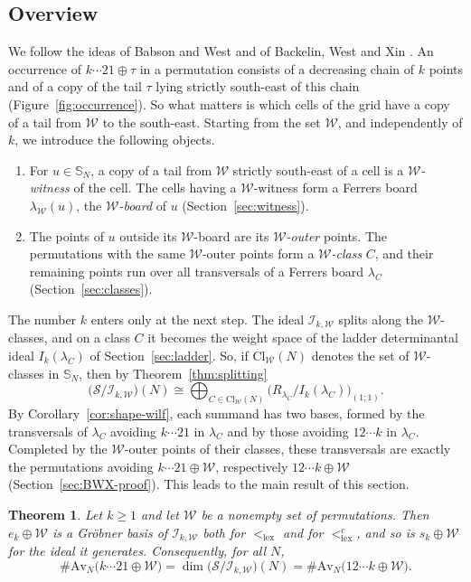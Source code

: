\documentclass[11pt]{amsart}
\newtheorem{theorem}{Theorem}[section]
\theoremstyle{definition}
\theoremstyle{remark}
\newcommand{\bS}{\mathbb{S}}
\newcommand{\Cl}{\mathrm{Cl}}
\newcommand{\cI}{\mathscr{I}}
\newcommand{\cS}{\mathscr{S}}
\newcommand{\cW}{\mathcal{W}}
\newcommand{\Av}{\mathrm{Av}}
\newcommand{\lex}{\mathrm{lex}}
\begin{document}
\subsection{Overview}
We follow the ideas of Babson and West \cite{BW} and of Backelin, West and Xin \cite{BWX}. An occurrence of $k\cdots21\oplus\tau$ in a permutation consists of a decreasing chain of $k$ points and of a copy of the tail $\tau$ lying strictly south-east of this chain (Figure~\ref{fig:occurrence}). So what matters is which cells of the grid have a copy of a tail from $\cW$ to the south-east. Starting from the set $\cW$, and independently of $k$, we introduce the following objects.
\begin{enumerate}
\item For $u\in\bS_N$, a copy of a tail from $\cW$ strictly south-east of a cell is a \emph{$\cW$-witness} of the cell. The cells having a $\cW$-witness form a Ferrers board $\lambda_\cW(u)$, the \emph{$\cW$-board} of $u$ (Section~\ref{sec:witness}).
\item The points of $u$ outside its $\cW$-board are its \emph{$\cW$-outer} points. The permutations with the same $\cW$-outer points form a \emph{$\cW$-class} $C$, and their remaining points run over all transversals of a Ferrers board $\lambda_C$ (Section~\ref{sec:classes}).
\end{enumerate}
The number $k$ enters only at the next step. The ideal $\cI_{k,\cW}$ splits along the $\cW$-classes, and on a class $C$ it becomes the weight space of the ladder determinantal ideal $I_k(\lambda_C)$ of Section~\ref{sec:ladder}. So, if $\Cl_\cW(N)$ denotes the set of $\cW$-classes in $\bS_N$, then by Theorem~\ref{thm:splitting}
\begin{equation}\label{eq:splitting}
\bigl(\cS/\cI_{k,\cW}\bigr)(N)\cong\bigoplus_{C\in\Cl_\cW(N)}\bigl(R_{\lambda_C}/I_k(\lambda_C)\bigr)_{(1;1)}.
\end{equation}
By Corollary~\ref{cor:shape-wilf}, each summand has two bases, formed by the transversals of $\lambda_C$ avoiding $k\cdots21$ in $\lambda_C$ and by those avoiding $12\cdots k$ in $\lambda_C$. Completed by the $\cW$-outer points of their classes, these transversals are exactly the permutations avoiding $k\cdots21\oplus\cW$, respectively $12\cdots k\oplus\cW$ (Section~\ref{sec:BWX-proof}). This leads to the main result of this section.

\begin{theorem}\label{thm:bwx}
Let $k\ge1$ and let $\cW$ be a nonempty set of permutations. Then $e_k\oplus\cW$ is a Gr\"obner basis of $\cI_{k,\cW}$ both for $<_\lex$ and for $<_\lex^c$, and so is $s_k\oplus\cW$ for the ideal it generates. Consequently, for all $N$,
\[
\#\Av_N\bigl(k\cdots21\oplus\cW\bigr)=\dim\bigl(\cS/\cI_{k,\cW}\bigr)(N)=\#\Av_N\bigl(12\cdots k\oplus\cW\bigr).
\]
\end{theorem}
\end{document}
